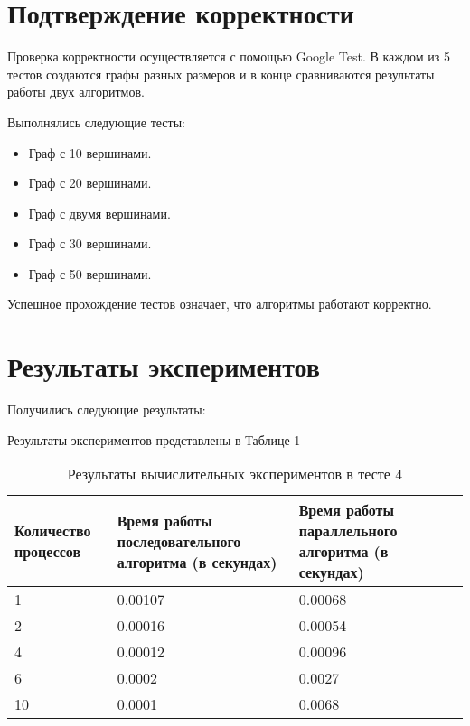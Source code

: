 \documentclass{report}
\begin{document}
\section*{Подтверждение корректности}
Проверка корректности осуществляется с помощью Google Test. В каждом из 5 тестов создаются графы разных размеров и в конце сравниваются результаты работы двух алгоритмов. 
\par Выполнялись следующие тесты:
\begin{itemize}
  \item Граф с 10 вершинами.
  \item Граф с 20 вершинами.
  \item Граф с двумя вершинами.
  \item Граф с 30 вершинами.
  \item Граф с 50 вершинами.
\end{itemize}
\par Успешное прохождение тестов означает, что алгоритмы работают корректно.
\newpage

\section*{Результаты экспериментов}
Получились следующие результаты:
\par Результаты экспериментов представлены в Таблице 1

\begin{table}[!h]
\caption{Результаты вычислительных экспериментов в тесте 4}
\centering
\begin{tabular}{| p{2cm} | p{3cm} | p{4cm} | p{2cm} |}
\hline
Количество процессов & Время работы последовательного алгоритма (в секундах) & Время работы параллельного алгоритма (в секундах)  \\[5pt]
\hline
1        & 0.00107        & 0.00068      \\
2        & 0.00016        & 0.00054      \\
4        & 0.00012        & 0.00096      \\
6        & 0.0002         & 0.0027       \\
10       & 0.0001         & 0.0068       \\

\hline
\end{tabular}
\end{table}
\newpage
\end{document}
